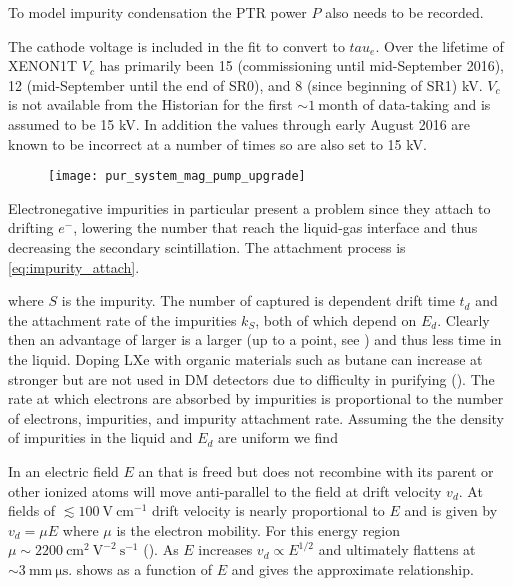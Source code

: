 {To model impurity condensation the PTR power $P$ also needs to be recorded.

The cathode voltage is included in the fit to convert \il to $tau_e$.  Over the lifetime of XENON1T $V_c$ has primarily been 15
(commissioning until mid-September 2016), 12 (mid-September until the end of SR0), and 8 (since beginning of SR1) kV.  $V_c$ is not
available from the Historian for the first ${\sim} 1\ \mathrm{month}$ of data-taking and is assumed to be 15 kV.  In addition the values
through early August 2016 are known to be incorrect at a number of times so are also set to 15 kV.

\begin{figure}
\centering
\texttt{[image: pur\_system\_mag\_pump\_upgrade]}
\caption{}
\label{fig:mag_pump}
\end{figure}

Electronegative impurities
in particular present a problem
since they attach to drifting $e^{-}$,
lowering the number that reach the liquid-gas interface and thus decreasing the secondary scintillation.  The attachment process
is \eqref{eq:impurity_attach}.

\noindent where $S$ is the impurity.  The number of \electron captured is dependent drift time $t_{d}$ and the
attachment rate of
the impurities $k_{S}$, both of which depend on $E_{d}$.  Clearly then an advantage of larger
\efields is a larger
\vd (up to a point, see ) and thus less time in the liquid.  Doping LXe with organic materials such as butane
can increase \vd at stronger
\efields but are not used in DM detectors due to difficulty in purifying ().  The rate at which electrons are
absorbed by impurities is proportional to the number of electrons, impurities, and impurity attachment rate.  Assuming the the density
of impurities in the liquid and $E_{d}$ are uniform we find

In an electric field $E$ an \electron that is freed but does not recombine with its parent or other ionized atoms will move anti-parallel
to the field at drift velocity $v_{d}$.  At fields of $\lesssim 100\ \mathrm{V\ cm^{-1}}$ drift velocity is nearly proportional to
$E$ and is given by $v_{d} = \mu E$
where $\mu$ is the electron mobility.  For this energy region $\mu \sim 2200\ \mathrm{cm^{2}\ V^{-2}\ s^{-1}}$ ().  As
$E$ increases $v_{d} \propto E^{1/2}$ and ultimately flattens at $\sim 3\ \mathrm{mm\ \mu s}$.   shows \vd
as a function of $E$ and  gives the approximate relationship.

}

